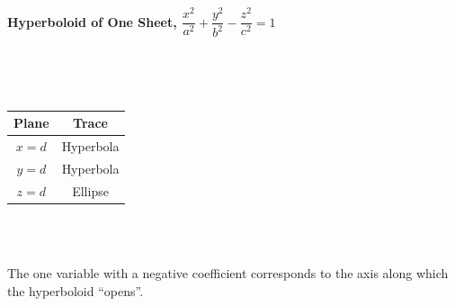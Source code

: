 \noindent\textbf{Hyperboloid of One Sheet, \quad$\dfrac{x^2}{a^2}+\dfrac{y^2}{b^2}-\dfrac{z^2}{c^2}=1$}\bigskip\\
\begin{minipage}{1.1\linewidth}
 \noindent%
 \begin{minipage}[c]{.35\linewidth}
  \mbox{}\\
 \end{minipage}%
 \begin{minipage}[c]{.23\linewidth}
  \mbox{}\\
  \begin{tabular}{cc}
   \textbf{Plane}  & \textbf{Trace} \\\midrule
   $x=d$ & Hyperbola\\
   $y=d$ & Hyperbola\\
   $z=d$ & Ellipse
  \end{tabular}
 \end{minipage}%
 \begin{minipage}[c]{.4\linewidth}
  \mbox{}\\
 \end{minipage}
 \bigskip\\
  The one variable with a negative coefficient corresponds to the axis along which the hyperboloid ``opens''.
\end{minipage}

\clearpage

